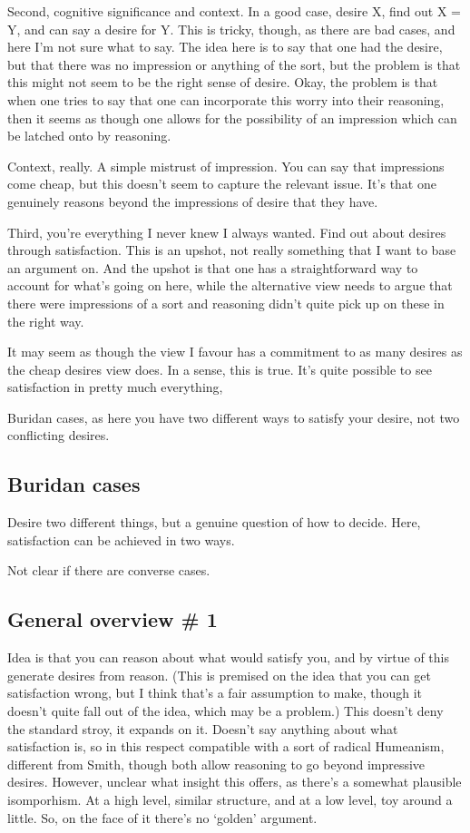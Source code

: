 \documentclass[10pt]{article}
\begin{document}
Second, cognitive significance and context.
In a good case, desire X, find out X = Y, and can say a desire for Y.
This is tricky, though, as there are bad cases, and here I'm not sure what to say.
The idea here is to say that one had the desire, but that there was no impression or anything of the sort, but the problem is that this might not seem to be the right sense of desire.
Okay, the problem is that when one tries to say that one can incorporate this worry into their reasoning, then it seems as though one allows for the possibility of an impression which can be latched onto by reasoning.


Context, really.
A simple mistrust of impression.
You can say that impressions come cheap, but this doesn't seem to capture the relevant issue.
It's that one genuinely reasons beyond the impressions of desire that they have.


Third, you're everything I never knew I always wanted.
Find out about desires through satisfaction.
This is an upshot, not really something that I want to base an argument on.
And the upshot is that one has a straightforward way to account for what's going on here, while the alternative view needs to argue that there were impressions of a sort and reasoning didn't quite pick up on these in the right way.

It may seem as though the view I favour has a commitment to as many desires as the cheap desires view does.
In a sense, this is true.
It's quite possible to see satisfaction in pretty much everything,



Buridan cases, as here you have two different ways to satisfy your desire, not two conflicting desires.


\subsection{Buridan cases}
\label{sec:buridan-cases}

Desire two different things, but a genuine question of how to decide.
Here, satisfaction can be achieved in two ways.

Not clear if there are converse cases.


\subsection{General overview \# 1}
\label{sec:general-overview-}


Idea is that you can reason about what would satisfy you, and by virtue of this generate desires from reason.
(This is premised on the idea that you can get satisfaction wrong, but I think that's a fair assumption to make, though it doesn't quite fall out of the idea, which may be a problem.)
This doesn't deny the standard stroy, it expands on it.
Doesn't say anything about what satisfaction is, so in this respect compatible with a sort of radical Humeanism, different from Smith, though both allow reasoning to go beyond impressive desires.
However, unclear what insight this offers, as there's a somewhat plausible isomporhism.
At a high level, similar structure, and at a low level, toy around a little.
So, on the face of it there's no `golden' argument.
\end{document}
